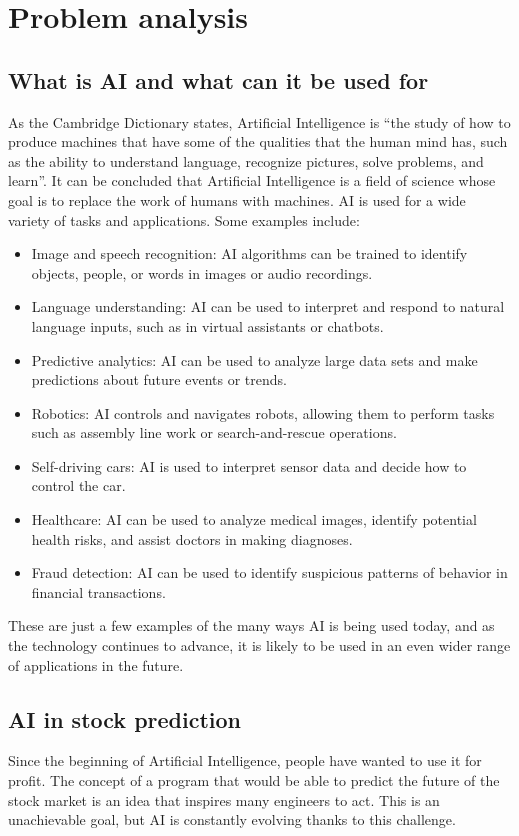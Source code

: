 \chapter{Problem analysis}

\section{What is AI and what can it be used for}
As the Cambridge Dictionary states, Artificial Intelligence is “the study of how to produce machines that have some of the qualities that the human mind has, such as the ability to understand language, recognize pictures, solve problems, and learn”\cite{bib:cambridge}. It can be concluded that Artificial Intelligence is a field of science whose goal is to replace the work of humans with machines.
AI is used for a wide variety of tasks and applications. Some examples include:
\begin{itemize}
    \item Image and speech recognition: AI algorithms can be trained to identify objects, people, or words in images or audio recordings.
    \item Language understanding: AI can be used to interpret and respond to natural language inputs, such as in virtual assistants or chatbots.
    \item Predictive analytics: AI can be used to analyze large data sets and make predictions about future events or trends.
    \item Robotics: AI controls and navigates robots, allowing them to perform tasks such as assembly line work or search-and-rescue operations.
    \item Self-driving cars: AI is used to interpret sensor data and decide how to control the car.
    \item Healthcare: AI can be used to analyze medical images, identify potential health risks, and assist doctors in making diagnoses.
    \item Fraud detection: AI can be used to identify suspicious patterns of behavior in financial transactions.
\end{itemize} 
These are just a few examples of the many ways AI is being used today, and as the technology continues to advance, it is likely to be used in an even wider range of applications in the future.\cite{bib:whatIsAI}

\section{AI in stock prediction}
Since the beginning of Artificial Intelligence, people have wanted to use it for profit. The concept of a program that would be able to predict the future of the stock market is an idea that inspires many engineers to act. This is an unachievable goal, but AI is constantly evolving thanks to this challenge.

